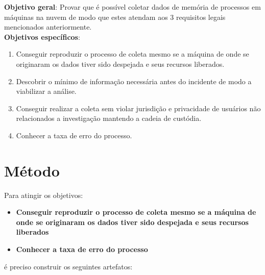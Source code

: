 \documentclass[12pt,				%
	openright,			%
	oneside,			%
	a4paper,			%
	english,			%
	brazil				%
	]{abntex2}
\begin{document}
\noindent \textbf{Objetivo geral}: Provar que é possível coletar dados de memória de processos em máquinas na nuvem de modo que estes atendam
aos 3 requisitos legais mencionados anteriormente. \\

\noindent \textbf{Objetivos específicos}:
\begin{enumerate}
 \item Conseguir reproduzir o processo de coleta mesmo se a máquina de onde se originaram os dados tiver sido despejada e seus recursos liberados.
 \item Descobrir o mínimo de informação necessária antes do incidente de modo a viabilizar a análise.
 \item Conseguir realizar a coleta sem violar jurisdição e privacidade de usuários não relacionados a investigação mantendo a cadeia de custódia.
 \item Conhecer a taxa de erro do processo.
\end{enumerate}

\chapter{Método} \label{chap:metodo}

\begin{flushleft}Para atingir os objetivos:\end{flushleft} 

\begin{itemize}
 \item \textbf{Conseguir reproduzir o processo de coleta mesmo se a máquina de onde se originaram os dados tiver sido despejada e seus recursos liberados}
 \item \textbf{Conhecer a taxa de erro do processo} 
\end{itemize}

\begin{flushleft}é preciso construir os seguintes artefatos:\end{flushleft}
\end{document}
